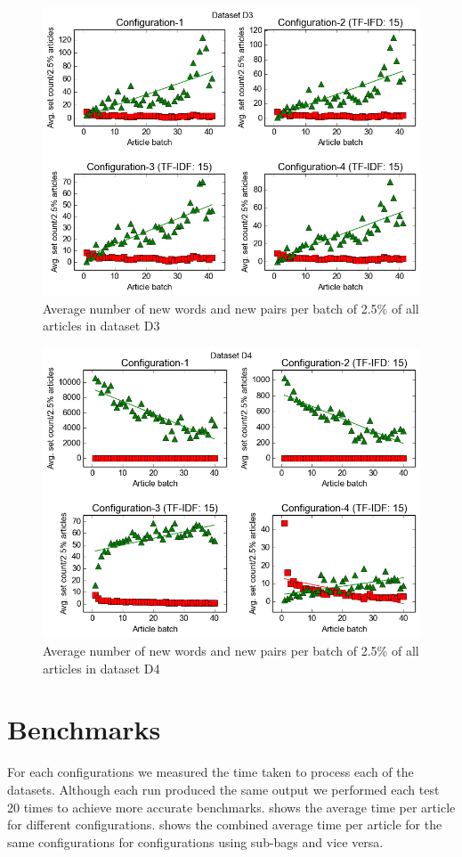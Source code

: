 \begin{figure}[ht]
  \centering
  \includegraphics[scale=0.70]{images/D3-plot.png}
  \caption{Average number of new words and new pairs per batch of 2.5\% of all articles in dataset D3}
  \label{fig:setPlot3}
\end{figure}

\begin{figure}[ht]
  \centering
  \includegraphics[scale=0.70]{images/D4-plot.png}
  \caption{Average number of new words and new pairs per batch of 2.5\% of all articles in dataset D4}
  \label{fig:setPlot4}
\end{figure}

\section{Benchmarks}
For each configurations we measured the time taken to process each of the datasets. Although each run produced the same output we performed each test 20 times to achieve more accurate benchmarks.  shows the average time per article for different configurations.  shows the combined average time per article for the same configurations for configurations using sub-bags and vice versa.

